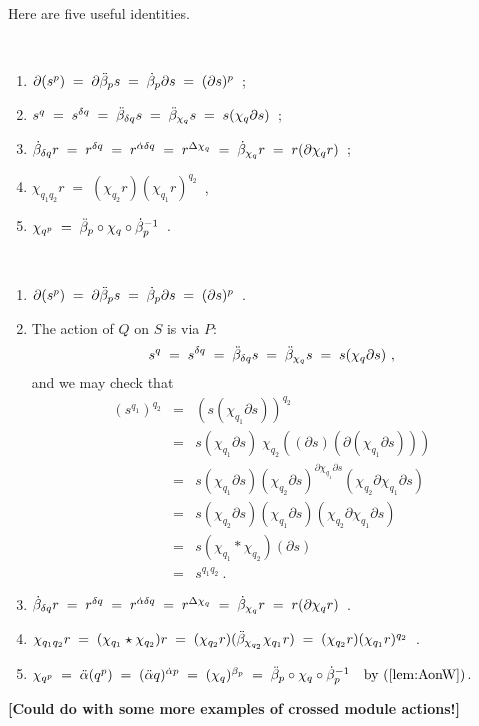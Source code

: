 \bigskip
Here are five useful identities.
\begin{lem} \label{lem:ids5}
\mbox{}\\
\vspace{-5mm}
\begin{enumerate}[{\rm (a)}]
\item
$\partial(s^p) \;=\;
 \partial \ddot{\beta}_p s \;=\;
 \dot{\beta}_p \partial s \;=\;
 (\partial s)^p$~;
\item
$s^q \;=\;
 s^{\delta q} \;=\;
 \ddot{\beta}_{\delta q}s \;=\;
 \ddot{\beta}_{\chi_q}s \;=\;
 s(\chi_q \partial s)$~; 
\item
$\dot{\beta}_{\delta q}r \;=\;
 r^{\delta q} \;=\;
 r^{\dot{\alpha} \delta q} \;=\;
 r^{\Delta \chi_q} \;=\;
 \dot{\beta}_{\chi_q} r \;=\;
 r(\partial\chi_q r)$~;
\item
$\chi_{q_1q_2} r \;=\;
 (\chi_{q_2} r)(\chi_{q_1} r)^{q_2}$~,
\item
$\chi_{q^p} \;=\; \ddot{\beta}_p \circ \chi_q \circ {\dot{\beta}_p}^{-1}$~.
\end{enumerate}
\end{lem}
\begin{pf}
\mbox{}\\
\vspace{-5mm}
\begin{enumerate}[{\rm (a)}]
\item
$\partial(s^p) \;=\;
 \partial \ddot{\beta}_p s \;=\;
 \dot{\beta}_p \partial s \;=\;
 (\partial s)^p$~.
\item
The action of $Q$ on $S$ is via $P$: 
$$
s^q \;=\; s^{\delta q} \;=\; \ddot{\beta}_{\delta q}s 
    \;=\; \ddot{\beta}_{\chi_q}s \;=\; s(\chi_q \partial s)~,
$$
and we may check that
\begin{eqnarray*}
(s^{q_1})^{q_2}
  & = &  (s(\chi_{q_1}\partial s))^{q_2} \\
  & = &  s(\chi_{q_1}\partial s)\; 
          \chi_{q_2}((\partial s)(\partial(\chi_{q_1}\partial s))) \\
  & = &  s(\chi_{q_1}\partial s) 
          (\chi_{q_2}\partial s)^{\partial\chi_{q_1}\partial s}
          (\chi_{q_2}\partial\chi_{q_1}\partial s) \\
  & = &  s(\chi_{q_2}\partial s)(\chi_{q_1}\partial s)
          (\chi_{q_2}\partial\chi_{q_1}\partial s) \\
  & = &  s(\chi_{q_1} \ast \chi_{q_2})(\partial s) \\
  & = &  s^{q_1q_2}~. 
\end{eqnarray*}
\item
$\dot{\beta}_{\delta q}r \;=\;
 r^{\delta q} \;=\;
 r^{\dot{\alpha} \delta q} \;=\;
 r^{\Delta \chi_q} \;=\;
 \dot{\beta}_{\chi_q} r \;=\;
 r(\partial\chi_q r)$~. 
\item
$\chi_{q_1q_2}r \;=\; 
 (\chi_{q_1} \star \chi_{q_2})r \;=\; 
 (\chi_{q_2}r)(\ddot{\beta}_{\chi_{q_2}}\chi_{q_1}r) \;=\; 
 (\chi_{q_2}r)(\chi_{q_1}r)^{q_2}$~. 
\item
$\chi_{q^p} \;=\;
 \ddot{\alpha}(q^p) \;=\;
 (\ddot{\alpha} q)^{\dot{\alpha} p} \;=\;
 (\chi_q)^{\beta_p} \;=\;
 \ddot{\beta}_p \circ \chi_q \circ {\dot{\beta}_p}^{-1}
 \quad\mbox{by (\ref{lem:AonW})}$.
\end{enumerate}
\end{pf}

\vspace{3mm}
\noindent
{\bf [Could do with some more examples of crossed module actions!]}
\vspace{3mm}